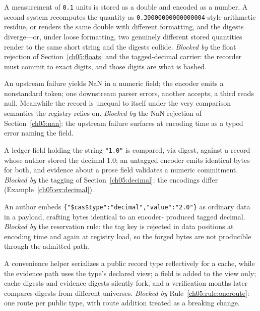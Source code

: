 \begin{example}\label{ch05:ex:pointone}
A measurement of \texttt{0.1} units is stored as a double and encoded as
a number. A second system recomputes the quantity as
\texttt{0.30000000000000004}-style arithmetic residue, or renders the
same double with different formatting, and the digests diverge---or,
under loose formatting, two genuinely different stored quantities render
to the same short string and the digests collide. \emph{Blocked by} the
float rejection of Section~\ref{ch05:floats} and the tagged-decimal
carrier: the recorder must commit to exact digits, and those digits are
what is hashed.
\end{example}

\begin{example}\label{ch05:ex:nan}
An upstream failure yields NaN in a numeric field; the encoder emits a
nonstandard token; one downstream parser errors, another accepts, a third
reads null. Meanwhile the record is unequal to itself under the very
comparison semantics the registry relies on. \emph{Blocked by} the NaN
rejection of Section~\ref{ch05:nan}: the upstream failure surfaces at
encoding time as a typed error naming the field.
\end{example}

\begin{example}\label{ch05:ex:pun}
A ledger field holding the string \texttt{"1.0"} is compared, via digest,
against a record whose author stored the decimal $1.0$; an untagged
encoder emits identical bytes for both, and evidence about a prose field
validates a numeric commitment. \emph{Blocked by} the tagging of
Section~\ref{ch05:decimal}: the encodings differ
(Example~\ref{ch05:ex:decimal}).
\end{example}

\begin{example}\label{ch05:ex:tagforgery}
An author embeds \texttt{\{"\$cas\$type":"decimal","value":"2.0"\}} as
ordinary data in a payload, crafting bytes identical to an encoder-
produced tagged decimal. \emph{Blocked by} the reservation rule: the tag
key is rejected in data positions at encoding time and again at registry
load, so the forged bytes are not producible through the admitted path.
\end{example}

\begin{example}\label{ch05:ex:tworoutes}
A convenience helper serializes a public record type reflectively for a
cache, while the evidence path uses the type's declared view; a field is
added to the view only; cache digests and evidence digests silently fork,
and a verification months later compares digests from different
universes. \emph{Blocked by} Rule~\ref{ch05:rule:oneroute}: one route per
public type, with route addition treated as a breaking change.
\end{example}

